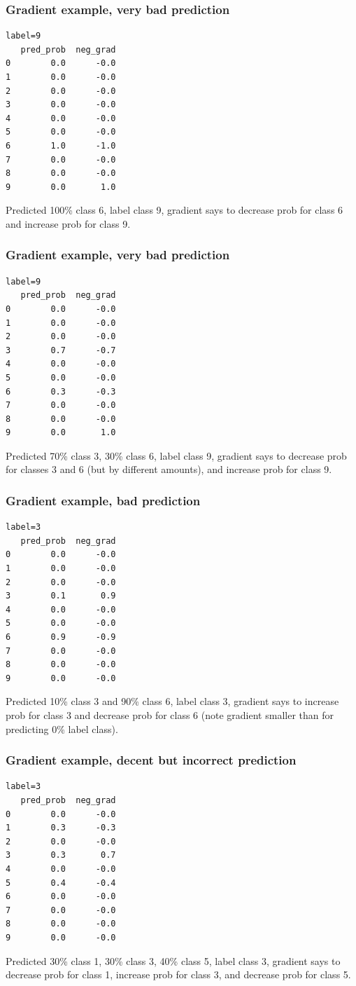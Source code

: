 \documentclass{beamer}
\begin{document}
\begin{frame}[fragile]
  \frametitle{Gradient example, very bad prediction}
\begin{verbatim}
label=9
   pred_prob  neg_grad
0        0.0      -0.0
1        0.0      -0.0
2        0.0      -0.0
3        0.0      -0.0
4        0.0      -0.0
5        0.0      -0.0
6        1.0      -1.0
7        0.0      -0.0
8        0.0      -0.0
9        0.0       1.0
\end{verbatim}
  Predicted 100\% class 6, label class 9, gradient says to decrease prob for
  class 6 and increase prob for class 9.
\end{frame}

\begin{frame}[fragile]
  \frametitle{Gradient example, very bad prediction}
\begin{verbatim}
label=9
   pred_prob  neg_grad
0        0.0      -0.0
1        0.0      -0.0
2        0.0      -0.0
3        0.7      -0.7
4        0.0      -0.0
5        0.0      -0.0
6        0.3      -0.3
7        0.0      -0.0
8        0.0      -0.0
9        0.0       1.0
\end{verbatim}
  Predicted 70\% class 3, 30\% class 6, label class 9, gradient says
  to decrease prob for classes 3 and 6 (but by different amounts), and
  increase prob for class 9.
\end{frame}

\begin{frame}[fragile]
  \frametitle{Gradient example, bad prediction}
\begin{verbatim}
label=3
   pred_prob  neg_grad
0        0.0      -0.0
1        0.0      -0.0
2        0.0      -0.0
3        0.1       0.9
4        0.0      -0.0
5        0.0      -0.0
6        0.9      -0.9
7        0.0      -0.0
8        0.0      -0.0
9        0.0      -0.0
\end{verbatim}
  Predicted 10\% class 3 and 90\% class 6, label class 3, gradient
  says to increase prob for class 3 and decrease prob for class 6 (note
  gradient smaller than for predicting 0\% label class).
\end{frame}

\begin{frame}[fragile]
  \frametitle{Gradient example, decent but incorrect prediction}
\begin{verbatim}
label=3
   pred_prob  neg_grad
0        0.0      -0.0
1        0.3      -0.3
2        0.0      -0.0
3        0.3       0.7
4        0.0      -0.0
5        0.4      -0.4
6        0.0      -0.0
7        0.0      -0.0
8        0.0      -0.0
9        0.0      -0.0
\end{verbatim}
  Predicted 30\% class 1, 30\% class 3, 40\% class 5, label class 3, gradient says to
  decrease prob for class 1, increase prob for class 3, and decrease prob for class 5.
\end{frame}
\end{document}
